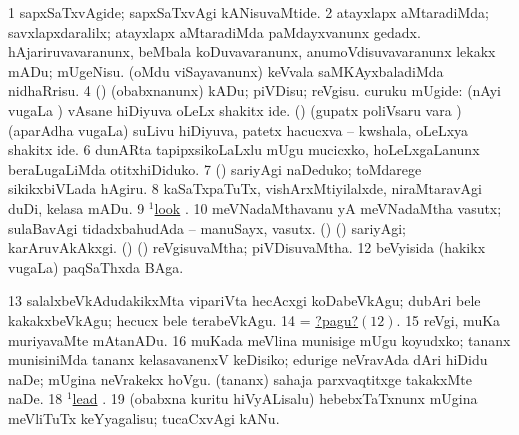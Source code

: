 \noindent
\gl{\pagu}
\bmng
\bnum
\num{1}  sapxSaTxvAgide; sapxSaTxvAgi kANisuvaMtide. 
\num{2}  atayxlapx aMtaradiMda; savxlapxdaralilx;  atayxlapx aMtaradiMda paMdayxvanunx gedadx. 
  
\banum
{} hAjariruvavaranunx, beMbala koDuvavaranunx, anumoVdisuvavaranunx lekakx mADu; mUgeNisu. 
 (oMdu viSayavanunx) keVvala saMKAyxbaladiMda nidhaRrisu. 
\eanum
\numie
\num{4}  (\ashi) (obabxnanunx) kADu; piVDisu; reVgisu. 
  curuku mUgide: 
\banum
{} (nAyi \mo vugaLa \vi) vAsane hiDiyuva oLeLx shakitx ide. 
 (\rUpa) (gupatx poliVsaru \mo vara \vi) (aparAdha \mo vugaLa) suLivu hiDiyuva, patetx hacucxva -- kwshala, oLeLxya shakitx ide. 
\eanum
\numie
\num{6}  dunARta tapipxsikoLaLxlu mUgu mucicxko, hoLeLxgaLanunx beraLugaLiMda otitxhiDiduko. 
\num{7}  (\ashi) sariyAgi naDeduko; toMdarege sikikxbiVLada hAgiru. 
\num{8}  kaSaTxpaTuTx, vishArxMtiyilalxde, niraMtaravAgi duDi, kelasa mADu. 
\num{9} \hyperref{kandict_l.pdf}{L}{look(1) nuga(8)}{$^1$look} . 
\num{10}  meVNadaMthavanu yA meVNadaMtha vasutx; sulaBavAgi tidadxbahudAda -- manuSayx, vasutx. 
  
\banum
{} (\ame) (\ashi) sariyAgi; karAruvAkAkxgi. 
 (\AseTxrXV) (\ashi) reVgisuvaMtha; piVDisuvaMtha. 
\hypertarget{nose pagu12}{} 
\eanum
\numie
\num{12}  beVyisida (hakikx \mo vugaLa) paqSaThxda BAga. 
\num{13}  salalxbeVkAdudakikxMta vipariVta hecAcxgi koDabeVkAgu; dubAri bele kakakxbeVkAgu; hecucx bele terabeVkAgu. 
\num{14}  = \hyperlink{nose pagu12}{?pagu?\((12)\)}. 
\hypertarget{nose1 pagu15}{} 
\num{15}  reVgi, muKa muriyavaMte mAtanADu. 
\num{16}  muKada meVlina munisige mUgu koyudxko; tananx munisiniMda tananx kelasavanenxV keDisiko; 
  
\banum
{} edurige neVravAda dAri hiDidu naDe; mUgina neVrakekx hoVgu. 
 (tananx) sahaja parxvaqtitxge takakxMte naDe. 
\eanum
\numie
\num{18}  \hyperref{kandict_l.pdf}{L}{lead(1) nuga(3)}{$^1$lead} . 
\hypertarget{nose1pagu19}{} 
\num{19}  (obabxna kuritu hiVyALisalu) hebebxTaTxnunx mUgina meVliTuTx keYyagalisu; tucaCxvAgi kANu. 
\hypertarget{nose1 pagu20}{} 
